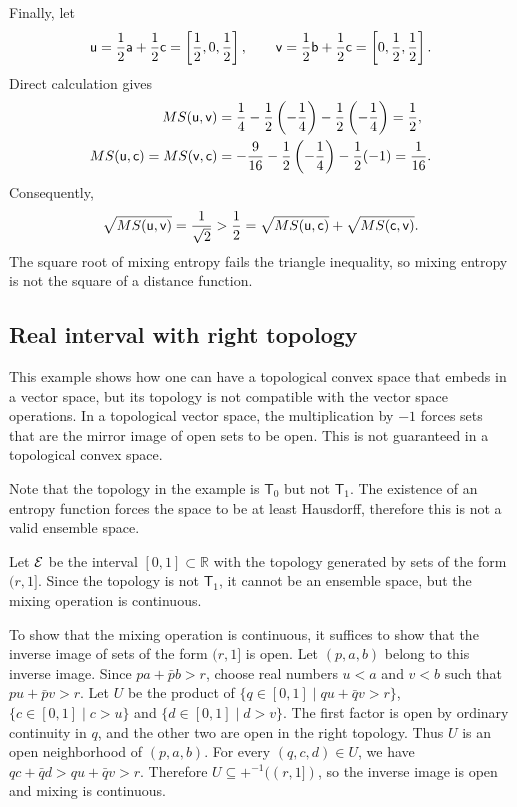 Finally, let
\begin{equation}
	\ens[u]=\frac12\ens[a]+\frac12\ens[c]
	=\left[\frac12,0,\frac12\right], \qquad
	\ens[v]=\frac12\ens[b]+\frac12\ens[c]
	=\left[0,\frac12,\frac12\right].
\end{equation}
Direct calculation gives
\begin{equation}
	\begin{aligned}
		MS(\ens[u],\ens[v])
		&=\frac14-\frac12\left(-\frac14\right)
		-\frac12\left(-\frac14\right)
		=\frac12, \\
		MS(\ens[u],\ens[c])
		=MS(\ens[v],\ens[c])
		&=-\frac9{16}-\frac12\left(-\frac14\right)
		-\frac12(-1)
		=\frac1{16}.
	\end{aligned}
\end{equation}
Consequently,
\begin{equation}
	\sqrt{MS(\ens[u],\ens[v])}
	=\frac1{\sqrt2}
	>\frac12
	=\sqrt{MS(\ens[u],\ens[c])}
	+\sqrt{MS(\ens[c],\ens[v])}.
\end{equation}
The square root of mixing entropy fails the triangle inequality, so mixing entropy is not the square of a distance function.

\subsection{Real interval with right topology}

This example shows how one can have a topological convex space that embeds in a vector space, but its topology is not compatible with the vector space operations. In a topological vector space, the multiplication by $-1$ forces sets that are the mirror image of open sets to be open. This is not guaranteed in a topological convex space.

Note that the topology in the example is $\mathsf{T}_0$ but not $\mathsf{T}_1$. The existence of an entropy function forces the space to be at least Hausdorff, therefore this is not a valid ensemble space.

\begin{example}
	Let $\Ens$ be the interval $[0,1] \subset \mathbb{R}$ with the topology generated by sets of the form $(r,1]$. Since the topology is not $\mathsf{T}_1$, it cannot be an ensemble space, but the mixing operation is continuous.
\end{example}

To show that the mixing operation is continuous, it suffices to show that the inverse image of sets of the form $(r,1]$ is open. Let $(p,a,b)$ belong to this inverse image. Since $pa+\bar{p}b>r$, choose real numbers $u<a$ and $v<b$ such that $pu+\bar{p}v>r$. Let $U$ be the product of $\{q\in[0,1]\mid qu+\bar{q}v>r\}$, $\{c\in[0,1]\mid c>u\}$ and $\{d\in[0,1]\mid d>v\}$. The first factor is open by ordinary continuity in $q$, and the other two are open in the right topology. Thus $U$ is an open neighborhood of $(p,a,b)$. For every $(q,c,d)\in U$, we have $qc+\bar{q}d>qu+\bar{q}v>r$. Therefore $U\subseteq+^{-1}((r,1])$, so the inverse image is open and mixing is continuous.

